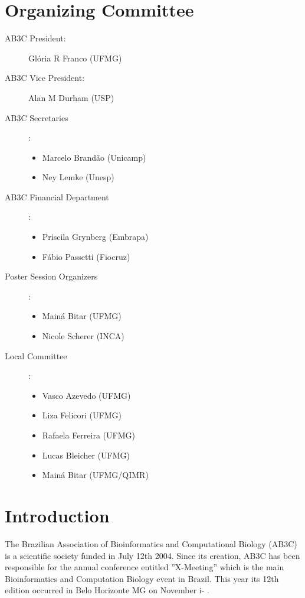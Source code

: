 
\chapter{Organizing Committee}

\begin{description}

\item[AB3C President:] Gl\'oria R Franco (UFMG)

\item[AB3C Vice President:] Alan M Durham (USP)


\item[AB3C Secretaries]:

\begin{itemize}
 \item Marcelo Brand\~ao (Unicamp) 
\item  Ney Lemke (Unesp)
\end{itemize}

\item[AB3C Financial Department]:

\begin{itemize}
\item Priscila Grynberg (Embrapa)
\item F\'abio Passetti (Fiocruz)
\end{itemize}

\item[Poster Session Organizers]:

\begin{itemize}
\item Main\'a Bitar (UFMG)
\item Nicole Scherer (INCA)
\end{itemize}

\item[Local Committee]:

\begin{itemize}
\item Vasco Azevedo (UFMG)
\item Liza Felicori (UFMG)
\item Rafaela Ferreira (UFMG)
\item Lucas Bleicher (UFMG)
\item Main\'a  Bitar (UFMG/QIMR)
\end{itemize}
\end{description}
\newpage
\chapter{Introduction}
The Brazilian Association of Bioinformatics and Computational Biology (AB3C) is
a scientific society funded in July 12th 2004.
Since its creation, AB3C has been responsible for the annual conference entitled
''X-Meeting'' which is the main Bioinformatics and Computation Biology event in
Brazil. This year its 12th edition occurred in Belo Horizonte MG on November i- .

